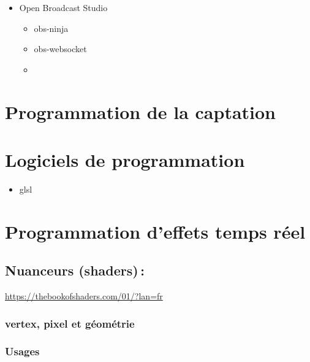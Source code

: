 \documentclass[
  french,
]{book}
\providecommand{\tightlist}{%
  \setlength{\itemsep}{0pt}\setlength{\parskip}{0pt}}
\begin{document}
\begin{itemize}
\tightlist
\item
  Open Broadcast Studio

  \begin{itemize}
  \tightlist
  \item
    obs-ninja
  \item
    obs-websocket
  \item
  \end{itemize}
\end{itemize}

\hypertarget{programmer_grab}{%
\section{Programmation de la captation}\label{programmer_grab}}

\hypertarget{programmer_logiciels}{%
\section{Logiciels de programmation}\label{programmer_logiciels}}

\begin{itemize}
\tightlist
\item
  glsl
\end{itemize}

\hypertarget{programmation-deffets-temps-ruxe9el}{%
\section{Programmation d'effets temps réel}\label{programmation-deffets-temps-ruxe9el}}

\hypertarget{nuanceurs-shaders}{%
\subsection{Nuanceurs (shaders)\,:}\label{nuanceurs-shaders}}

\url{https://thebookofshaders.com/01/?lan=fr}

\hypertarget{vertex-pixel-et-guxe9omuxe9trie}{%
\subsubsection{vertex, pixel et géométrie}\label{vertex-pixel-et-guxe9omuxe9trie}}

\hypertarget{usages-2}{%
\subsubsection{Usages}\label{usages-2}}
\end{document}
